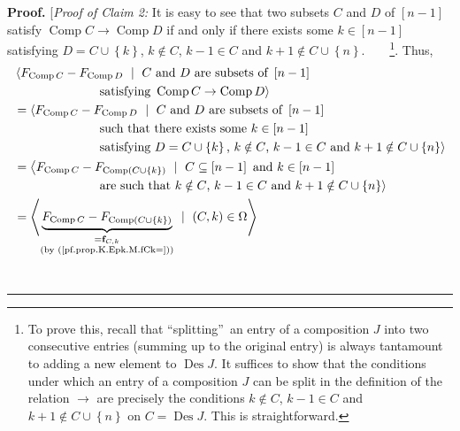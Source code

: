 \documentclass[numbers=enddot,12pt,final,onecolumn,notitlepage]{scrartcl}%
\theoremstyle{definition}
\newenvironment{proof}[1][Proof]{\noindent\textbf{#1.} }{\ \rule{0.5em}{0.5em}}
\begin{document}
\begin{proof}
[\textit{Proof of Claim 2:} It is easy to see that two subsets $C$ and $D$ of
$\left[  n-1\right]  $ satisfy $\operatorname*{Comp}C\rightarrow
\operatorname*{Comp}D$ if and only if there exists some $k\in\left[
n-1\right]  $ satisfying $D=C\cup\left\{  k\right\}  $, $k\notin C$, $k-1\in
C$ and $k+1\notin C\cup\left\{  n\right\}  $.\ \ \ \ \footnote{To prove this,
recall that \textquotedblleft splitting\textquotedblright\ an entry of a
composition $J$ into two consecutive entries (summing up to the original
entry) is always tantamount to adding a new element to $\operatorname*{Des}J$.
It suffices to show that the conditions under which an entry of a composition
$J$ can be split in the definition of the relation $\rightarrow$ are precisely
the conditions $k\notin C$, $k-1\in C$ and $k+1\notin C\cup\left\{  n\right\}
$ on $C=\operatorname*{Des}J$. This is straightforward.}. Thus,%
\begin{align*}
&  \left\langle F_{\operatorname*{Comp}C}-F_{\operatorname*{Comp}D}%
\ \mid\ C\text{ and }D\text{ are subsets of }\left[  n-1\right]  \right. \\
&  \ \ \ \ \ \ \ \ \ \ \ \ \ \ \ \ \ \ \ \ \left.  \text{satisfying
}\operatorname*{Comp}C\rightarrow\operatorname*{Comp}D\right\rangle \\
&  =\left\langle F_{\operatorname*{Comp}C}-F_{\operatorname*{Comp}D}%
\ \mid\ C\text{ and }D\text{ are subsets of }\left[  n-1\right]  \right. \\
&  \ \ \ \ \ \ \ \ \ \ \ \ \ \ \ \ \ \ \ \ \left.  \text{such that there
exists some }k\in\left[  n-1\right]  \right. \\
&  \ \ \ \ \ \ \ \ \ \ \ \ \ \ \ \ \ \ \ \ \left.  \text{satisfying }%
D=C\cup\left\{  k\right\}  \text{, }k\notin C\text{, }k-1\in C\text{ and
}k+1\notin C\cup\left\{  n\right\}  \right\rangle \\
&  =\left\langle F_{\operatorname*{Comp}C}-F_{\operatorname*{Comp}\left(
C\cup\left\{  k\right\}  \right)  }\ \mid\ C\subseteq\left[  n-1\right]
\text{ and }k\in\left[  n-1\right]  \right. \\
&  \ \ \ \ \ \ \ \ \ \ \ \ \ \ \ \ \ \ \ \ \left.  \text{are such that
}k\notin C\text{, }k-1\in C\text{ and }k+1\notin C\cup\left\{  n\right\}
\right\rangle \\
&  =\left\langle \underbrace{F_{\operatorname*{Comp}C}-F_{\operatorname*{Comp}%
\left(  C\cup\left\{  k\right\}  \right)  }}_{\substack{=\mathbf{f}%
_{C,k}\\\text{(by (\ref{pf.prop.K.Epk.M.fCk=}))}}}\ \mid\ \left(  C,k\right)
\in\Omega\right\rangle \\

\end{align*}
\end{proof}
\end{document}
